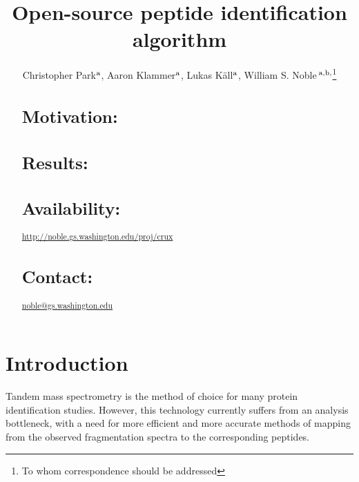 \documentclass{bioinfo}
\begin{document}

\title[Open-source peptide identification algorithm]{Open-source
peptide identification algorithm}
\author[Park \textit{et~al}]{Christopher Park$^{\rm a}$, Aaron Klammer$^{\rm a}$,
Lukas K\"{a}ll$^{\rm a}$, 
William S. Noble\,$^{\rm a,b,}$\footnote{To whom correspondence should be addressed}}
\address{
$^{\rm a}$Department of Computer Science and Engineering,
$^{\rm b}$Department of Genome Sciences, University of Washington,
  Seattle, WA, USA
}


\maketitle

\begin{abstract}
\section{Motivation:}

\section{Results:}

\section{Availability:}
\href{http://noble.gs.washington.edu/proj/crux}{http://noble.gs.washington.edu/proj/crux}
\section{Contact:} \href{noble@gs.washington.edu}{noble@gs.washington.edu}
\end{abstract}

\section{Introduction}

Tandem mass spectrometry is the method of choice for many protein
identification studies.  However, this technology currently suffers
from an analysis bottleneck, with a need for more efficient and more
accurate methods of mapping from the observed fragmentation spectra to
the corresponding peptides.
\end{document}
